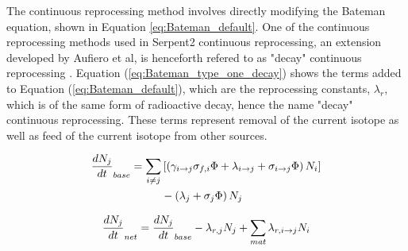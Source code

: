 The continuous reprocessing method involves directly modifying the Bateman equation, shown in Equation \eqref{eq:Bateman_default}. One of the continuous reprocessing methods used in Serpent2 continuous reprocessing, an extension developed by Aufiero et al, is henceforth refered to as "decay" continuous reprocessing \cite{aufiero_extended_2013}. Equation (\ref{eq:Bateman_type_one_decay}) shows the terms added to Equation (\ref{eq:Bateman_default}), which are the reprocessing constants, $\lambda_{r}$, which is of the same form of radioactive decay, hence the name "decay" continuous reprocessing. These terms represent removal of the current isotope as well as feed of the current isotope from other sources.

\begin{equation} \hfill
\begin{split}
\frac{dN_j}{dt}_{base} = \sum_{i \neq j}  & \left [ \left( \gamma_{i \rightarrow j} \sigma_{f, i} \Phi + \lambda _{i \rightarrow j} + \sigma_{i \rightarrow j} \Phi \right) N_i \right ]\\
 & - \left ( \lambda_j + \sigma_j \Phi \right ) N_j
\end{split}
\hfill\label{eq:Bateman_default} \end{equation}

\begin{equation} \hfill
\frac{dN_j}{dt}_{net} = \frac{dN_j}{dt}_{base} -  \lambda_{r, j} N_j + \sum_{mat} \lambda _{r, i \rightarrow j} N_i
\hfill\label{eq:Bateman_type_one_decay} \end{equation}

